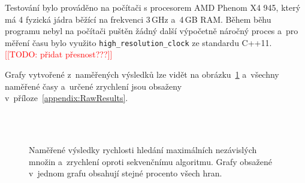 \documentclass[12pt]{article}
\newcommand{\todo}[1]{\textcolor{red}{[[TODO: #1]]}}
\begin{document}
Testování bylo prováděno na počítači s procesorem AMD Phenom X4 945, který má 4 fyzická jádra běžící na frekvenci 3\,GHz a~4\,GB RAM. Během běhu programu nebyl na počítači puštěn žádný další výpočetně náročný proces a~pro měření času bylo využito \texttt{high\_resolution\_clock} ze standardu C++11. \todo{přidat přesnost???}

Grafy vytvořené z~naměřených výsledků lze vidět na obrázku~\ref{fig:SpeedResults} a~všechny naměřené časy a~určené zrychlení jsou obsaženy v~příloze~\ref{appendix:RawResults}.

\begin{figure}[p]
    \centering
    \\
    \\
    \caption{Naměřené výsledky rychlosti hledání maximálních nezávislých množin a~zrychlení oproti sekvenčnímu algoritmu. Grafy obsažené v~jednom grafu obsahují stejné procento všech hran.} \label{fig:SpeedResults}
\end{figure}
\end{document}
